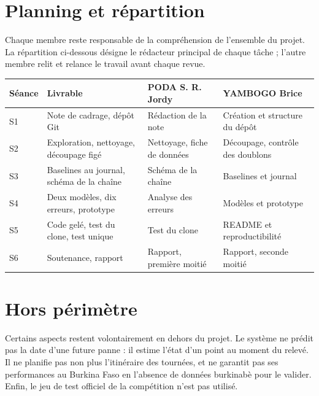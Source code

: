\documentclass[10pt,a4paper]{article}
\begin{document}
\section{Planning et répartition}
Chaque membre reste responsable de la compréhension de l'ensemble du projet. La répartition ci-dessous désigne le rédacteur principal de chaque tâche ; l'autre membre relit et relance le travail avant chaque revue.

\begin{tabularx}{\textwidth}{@{}p{1.1cm}>{\raggedright\arraybackslash}p{5.6cm}LL@{}}
\toprule
Séance & Livrable & PODA S. R. Jordy & YAMBOGO Brice \\
\midrule
S1 & Note de cadrage, dépôt Git & Rédaction de la note & Création et structure du dépôt \\
S2 & Exploration, nettoyage, découpage figé & Nettoyage, fiche de données & Découpage, contrôle des doublons \\
S3 & Baselines au journal, schéma de la chaîne & Schéma de la chaîne & Baselines et journal \\
S4 & Deux modèles, dix erreurs, prototype & Analyse des erreurs & Modèles et prototype \\
S5 & Code gelé, test du clone, test unique & Test du clone & README et reproductibilité \\
S6 & Soutenance, rapport & Rapport, première moitié & Rapport, seconde moitié \\
\bottomrule
\end{tabularx}

\section{Hors périmètre}
Certains aspects restent volontairement en dehors du projet. Le système ne prédit pas la date d'une future panne : il estime l'état d'un point au moment du relevé. Il ne planifie pas non plus l'itinéraire des tournées, et ne garantit pas ses performances au Burkina Faso en l'absence de données burkinabè pour le valider. Enfin, le jeu de test officiel de la compétition n'est pas utilisé.
\end{document}
